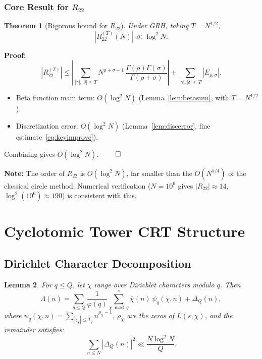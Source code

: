 \documentclass[11pt,a4paper]{article}
\newtheorem{theorem}{Theorem}[section]
\newtheorem{lemma}[theorem]{Lemma}
\theoremstyle{remark}
\begin{document}
\subsubsection{Core Result for $R_{22}$}

\begin{theorem}[Rigorous bound for $R_{22}$]\label{thm:R22}
Under GRH, taking $T = N^{1/2}$,
\begin{equation}\label{eq:R22bound}
|R_{22}^{(T)}(N)| \ll \log^2 N.
\end{equation}
\end{theorem}

\noindent\textbf{Proof:}
\[
|R_{22}^{(T)}| \leq \left|\sum_{|\gamma|,|\delta| \leq T} N^{\rho+\sigma-1}\, \frac{\Gamma(\rho)\Gamma(\sigma)}{\Gamma(\rho+\sigma)}\right| + \sum_{|\gamma|,|\delta| \leq T} |E_{\rho,\sigma}|.
\]
\begin{itemize}
\item Beta function main term: $O(\log^2 N)$ (Lemma~\ref{lem:betasum}, with $T = N^{1/2}$).
\item Discretization error: $O(\log^2 N)$ (Lemma~\ref{lem:discerror}, fine estimate~\eqref{eq:keyimprove}).
\end{itemize}
Combining gives $O(\log^2 N)$. $\qed$

\noindent\textbf{Note:} The order of $R_{22}$ is $O(\log^2 N)$, far smaller than the $O(N^{5/4})$ of the classical circle method. Numerical verification ($N = 10^6$ gives $|R_{22}| \approx 14$, $\log^2(10^6) \approx 190$) is consistent with this.

\section{Cyclotomic Tower CRT Structure}

\subsection{Dirichlet Character Decomposition}

\begin{lemma}\label{lem:char}
For $q \leq Q$, let $\chi$ range over Dirichlet characters modulo $q$. Then
\begin{equation}\label{eq:chardecomp}
\Lambda(n) = \sum_{q \leq Q} \frac{1}{\varphi(q)} \sum_{\chi \bmod q}^* \bar\chi(n)\, \psi_q(\chi, n) + \Delta_Q(n),
\end{equation}
where $\psi_q(\chi, n) = \sum_{|\gamma_\chi| \leq T_q} n^{\rho_\chi - 1}$, $\rho_\chi$ are the zeros of $L(s,\chi)$, and the remainder satisfies:
\begin{equation}\label{eq:charrem}
\sum_{n \leq N} |\Delta_Q(n)|^2 \ll \frac{N\log^2 N}{Q}.
\end{equation}
\end{lemma}
\end{document}
